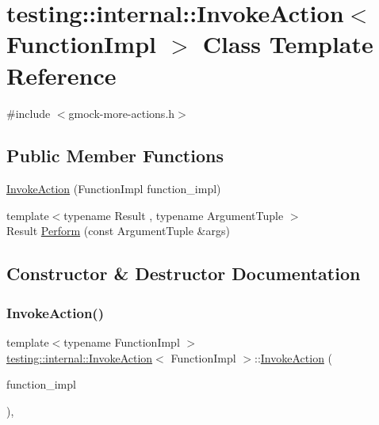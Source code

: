\hypertarget{classtesting_1_1internal_1_1InvokeAction}{}\section{testing\+::internal\+::Invoke\+Action$<$ Function\+Impl $>$ Class Template Reference}
\label{classtesting_1_1internal_1_1InvokeAction}


{\ttfamily \#include $<$gmock-\/more-\/actions.\+h$>$}

\subsection*{Public Member Functions}
\begin{DoxyCompactItemize}
\item 
\mbox{\hyperlink{classtesting_1_1internal_1_1InvokeAction_a786ce772624fc87a31891f465df7ce61}{Invoke\+Action}} (Function\+Impl function\+\_\+impl)
\item 
{\footnotesize template$<$typename Result , typename Argument\+Tuple $>$ }\\Result \mbox{\hyperlink{classtesting_1_1internal_1_1InvokeAction_af357ce691795b3520de1fda4ab8af8b2}{Perform}} (const Argument\+Tuple \&args)
\end{DoxyCompactItemize}


\subsection{Constructor \& Destructor Documentation}
\mbox{\label{classtesting_1_1internal_1_1InvokeAction_a786ce772624fc87a31891f465df7ce61}} 
\subsubsection{\texorpdfstring{InvokeAction()}{InvokeAction()}}
{\footnotesize\ttfamily template$<$typename Function\+Impl $>$ \\
\mbox{\hyperlink{classtesting_1_1internal_1_1InvokeAction}{testing\+::internal\+::\+Invoke\+Action}}$<$ Function\+Impl $>$\+::\mbox{\hyperlink{classtesting_1_1internal_1_1InvokeAction}{Invoke\+Action}} (\begin{DoxyParamCaption}\item[{Function\+Impl}]{function\+\_\+impl }\end{DoxyParamCaption})\hspace{0.3cm}{\ttfamily [inline]}, {\ttfamily [explicit]}}



